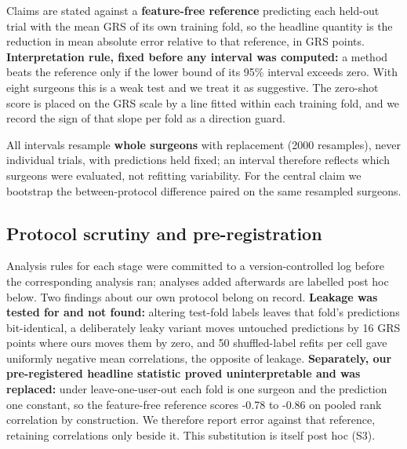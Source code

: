 Claims are stated against a \textbf{feature-free reference} predicting each held-out trial with the mean GRS of its own training fold, so the headline quantity is the reduction in mean absolute error relative to that reference, in GRS points. \textbf{Interpretation rule, fixed before any interval was computed:} a method beats the reference only if the lower bound of its 95\% interval exceeds zero. With eight surgeons this is a weak test and we treat it as suggestive. The zero-shot score is placed on the GRS scale by a line fitted within each training fold, and we record the sign of that slope per fold as a direction guard.

All intervals resample \textbf{whole surgeons} with replacement (2000 resamples), never individual trials, with predictions held fixed; an interval therefore reflects which surgeons were evaluated, not refitting variability. For the central claim we bootstrap the between-protocol difference paired on the same resampled surgeons.

\subsection{Protocol scrutiny and pre-registration}

Analysis rules for each stage were committed to a version-controlled log before the corresponding analysis ran; analyses added afterwards are labelled post hoc below. Two findings about our own protocol belong on record. \textbf{Leakage was tested for and not found:} altering test-fold labels leaves that fold's predictions bit-identical, a deliberately leaky variant moves untouched predictions by 16 GRS points where ours moves them by zero, and 50 shuffled-label refits per cell gave uniformly negative mean correlations, the opposite of leakage. \textbf{Separately, our pre-registered headline statistic proved uninterpretable and was replaced:} under leave-one-user-out each fold is one surgeon and the prediction one constant, so the feature-free reference scores -0.78 to -0.86 on pooled rank correlation by construction. We therefore report error against that reference, retaining correlations only beside it. This substitution is itself post hoc (S3).
